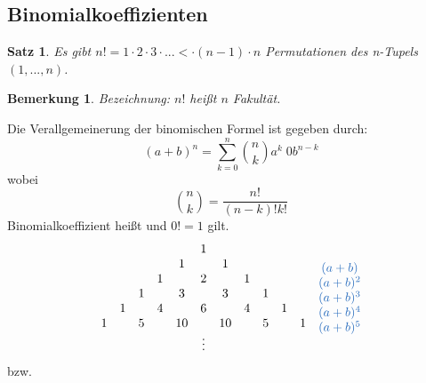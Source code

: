 \documentclass[12pt,a4paper]{report}%
\newtheorem{satz}{Satz}[section]
\newtheorem{bem}{Bemerkung}[section]
\numberwithin{equation}{section}
\def\colBlue#1{\begingroup\color{NavyBlue}{#1}\endgroup}
\numberwithin{equation}{subsection}
\begin{document}
  \subsection{Binomialkoeffizienten}
  \begin{satz}
    Es gibt $n! = 1 \cdot 2 \cdot 3 \cdot ...< \cdot (n-1) \cdot n$ Permutationen des n-Tupels $(1,...,n)$. 
  \end{satz}
  \begin{bem}
    Bezeichnung: $n!$ heißt $n$ Fakultät.
  \end{bem}
  Die Verallgemeinerung der binomischen Formel ist gegeben durch:
  \begin{equation}
    (a+b)^n = \sum_{k=0}^n \binom{n}{k} a^k \;0 b^{n-k}
  \end{equation}
  wobei 
  \begin{equation}
    \binom{n}{k} = \frac{n!}{(n-k)!k!}
  \end{equation}
  Binomialkoeffizient heißt und $0! = 1$ gilt.
  \begin{align}
    \begin{array}{c c c c c c c c c c c c}
      \; & \; &  \; & \; & \; &  1 & \; & \; & \; & \; & \;\\
      \; & \; &  \; & \; & 1  & \; &  1 & \; & \; & \; & \;\\
      \; & \; &  \; & 1  & \; & 2  & \; & 1  & \; & \; & \;\\
      \; & \; &  1  & \; & 3  & \; & 3  & \; & 1  & \; & \;\\
      \; & 1  &  \; & 4  & \; &  6 & \; & 4  & \; & 1  & \;\\
      1  & \; &  5  & \; & 10 & \; & 10 & \; & 5  & \; & 1 \\
      \; & \; &  \; & \; & \; &\vdots& \; & \; & \; & \; & \;\\
    \end{array}
    \begin{array}{c}
      \colBlue{(a+b)} \\
      \colBlue{(a+b)^2} \\
      \colBlue{(a+b)^3} \\
      \colBlue{(a+b)^4} \\
      \colBlue{(a+b)^5} \\
    \end{array}
  \end{align}
  bzw.
\end{document}
